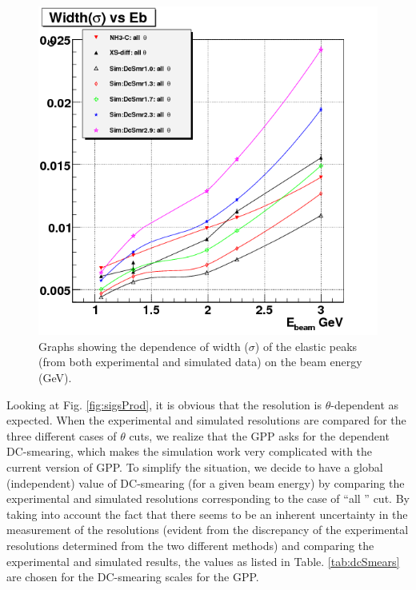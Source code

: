 \begin{figure}[h] %
\centering
  \leavevmode \includegraphics[width=1.0\textwidth]{figuresEG4/DcSmear/graphSigmaVsEb_SimThAll.png} 
  \caption[$E_{beam}$ dependence of DC smearing (Experimental) ]{Graphs showing the dependence of width ($\sigma$) of the elastic peaks (from both experimental and simulated data) on the beam energy (GeV).}
  \label{fig:sigsProdSim}
\end{figure}
    
     
     
Looking at Fig. \ref{fig:sigsProd}, it is obvious that the resolution is $\theta$-dependent as expected. %
When the experimental and simulated resolutions are compared for the three different cases of $\theta$ cuts, we realize that the GPP asks for the 
\th dependent DC-smearing, which makes the simulation work very complicated with the current version of GPP. To simplify the situation, we decide to 
have a global (\th independent) value of DC-smearing (for a given beam energy) by comparing the experimental and simulated resolutions corresponding to 
the case of ``all \th'' cut. %
By taking into account the fact that there seems to be an inherent 
uncertainty in the measurement of the resolutions (evident from the discrepancy of the experimental resolutions determined from the two different methods)
and comparing the experimental and simulated results, the values as listed in Table. \ref{tab:dcSmears} are chosen for the DC-smearing scales for the GPP.


